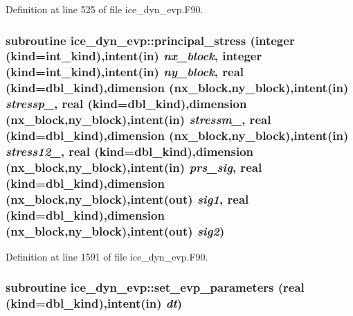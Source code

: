 Definition at line 525 of file ice\_\-dyn\_\-evp.F90.\hypertarget{namespaceice__dyn__evp_ad8621c859aae602cd6702347e2db568b}{
\subsubsection[{principal\_\-stress}]{\setlength{\rightskip}{0pt plus 5cm}subroutine ice\_\-dyn\_\-evp::principal\_\-stress (integer (kind=int\_\-kind),intent(in) {\em nx\_\-block}, \/  integer (kind=int\_\-kind),intent(in) {\em ny\_\-block}, \/  real (kind=dbl\_\-kind),dimension (nx\_\-block,ny\_\-block),intent(in) {\em stressp\_}, \/  real (kind=dbl\_\-kind),dimension (nx\_\-block,ny\_\-block),intent(in) {\em stressm\_}, \/  real (kind=dbl\_\-kind),dimension (nx\_\-block,ny\_\-block),intent(in) {\em stress12\_}, \/  real (kind=dbl\_\-kind),dimension (nx\_\-block,ny\_\-block),intent(in) {\em prs\_\-sig}, \/  real (kind=dbl\_\-kind),dimension (nx\_\-block,ny\_\-block),intent(out) {\em sig1}, \/  real (kind=dbl\_\-kind),dimension (nx\_\-block,ny\_\-block),intent(out) {\em sig2})}}
\label{namespaceice__dyn__evp_ad8621c859aae602cd6702347e2db568b}


Definition at line 1591 of file ice\_\-dyn\_\-evp.F90.\hypertarget{namespaceice__dyn__evp_ae005a696d21f367a95138aca2aa5bb07}{
\subsubsection[{set\_\-evp\_\-parameters}]{\setlength{\rightskip}{0pt plus 5cm}subroutine ice\_\-dyn\_\-evp::set\_\-evp\_\-parameters (real (kind=dbl\_\-kind),intent(in) {\em dt})}}
\label{namespaceice__dyn__evp_ae005a696d21f367a95138aca2aa5bb07}


